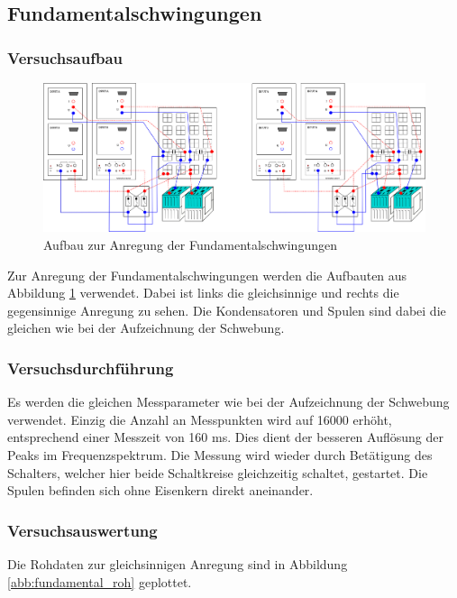 \subsection{Fundamentalschwingungen}


\subsubsection{Versuchsaufbau}

\begin{figure}[H]
\centering
\includegraphics[width=\textwidth]{bilder/aufbau_fundamental.png}
\caption{Aufbau zur Anregung der Fundamentalschwingungen}
\label{abb:aufbau_fundamental}
\end{figure}

Zur Anregung der Fundamentalschwingungen werden die Aufbauten aus Abbildung \ref{abb:aufbau_fundamental} verwendet. Dabei ist links die gleichsinnige und rechts die gegensinnige Anregung zu sehen. Die Kondensatoren und Spulen sind dabei die gleichen wie bei der Aufzeichnung der Schwebung.

\subsubsection{Versuchsdurchführung}

Es werden die gleichen Messparameter wie bei der Aufzeichnung der Schwebung verwendet. Einzig die Anzahl an Messpunkten wird auf 16000 erhöht, entsprechend einer Messzeit von 160 ms. Dies dient der besseren Auflösung der Peaks im Frequenzspektrum. Die Messung wird wieder durch Betätigung des Schalters, welcher hier beide Schaltkreise gleichzeitig schaltet, gestartet. Die Spulen befinden sich ohne Eisenkern direkt aneinander.


\subsubsection{Versuchsauswertung}

Die Rohdaten zur gleichsinnigen Anregung sind in Abbildung \ref{abb:fundamental_roh} geplottet.  

